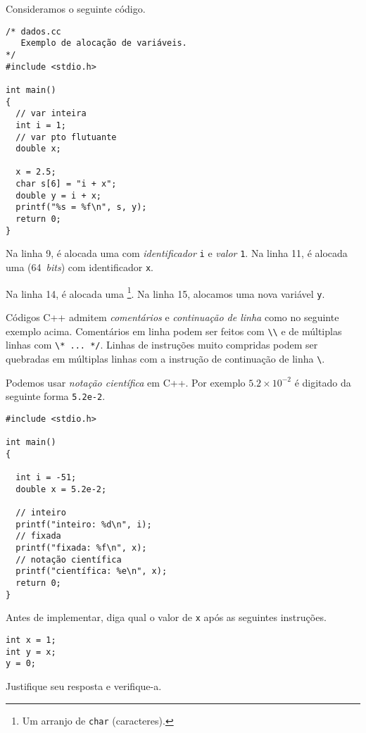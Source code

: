 \documentclass[12pt]{article}
\begin{document}
\begin{ex}
  Consideramos o seguinte código.
\begin{lstlisting}[caption=dados.cc]
/* dados.cc
   Exemplo de alocação de variáveis.
*/
#include <stdio.h>

int main() 
{
  // var inteira
  int i = 1;
  // var pto flutuante
  double x;

  x = 2.5;
  char s[6] = "i + x";
  double y = i + x;
  printf("%s = %f\n", s, y);
  return 0;
}
\end{lstlisting}

  Na linha 9, é alocada uma  com \emph{identificador} \lstinline+i+ e \emph{valor} \lstinline+1+. Na linha 11, é alocada uma  (64~\textit{bits}) com identificador \lstinline+x+.

  Na linha 14, é alocada uma \footnote{Um arranjo de \lstinline+char+ (caracteres).}. Na linha 15, alocamos uma nova variável \lstinline+y+.
\end{ex}

\begin{obs}
  Códigos C++ admitem \emph{comentários} e \emph{continuação de linha} como no seguinte exemplo acima. Comentários em linha podem ser feitos com \lstinline+\\+ e de múltiplas linhas com \lstinline+\* ... */+. Linhas de instruções muito compridas podem ser quebradas em múltiplas linhas com a instrução de continuação de linha \lstinline+\+.
\end{obs}

\begin{obs}
  Podemos usar \emph{notação científica} em C++. Por exemplo $5.2\times 10^{-2}$ é digitado da seguinte forma \lstinline+5.2e-2+.

\begin{lstlisting}[caption=notacaoCientifica.cpp]
#include <stdio.h>

int main()
{

  int i = -51;
  double x = 5.2e-2;

  // inteiro
  printf("inteiro: %d\n", i);
  // fixada
  printf("fixada: %f\n", x);
  // notação científica
  printf("científica: %e\n", x);
  return 0;
}
\end{lstlisting}
\end{obs}

\begin{exr}
  Antes de implementar, diga qual o valor de \lstinline+x+ após as seguintes instruções.
\begin{lstlisting}
int x = 1;
int y = x;
y = 0;
\end{lstlisting}
  Justifique seu resposta e verifique-a.
\end{exr}
\end{document}
